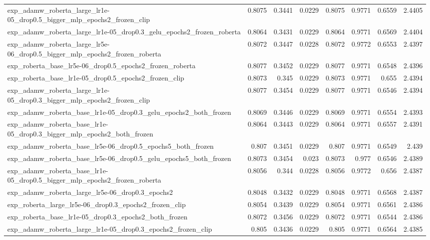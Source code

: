 \documentclass[a4paper,oneside,bibliography=totoc]{scrbook}
\begin{document}
\begin{landscape}
\begin{center}
\begin{longtable}{p{4cm} *{7}{r}}
        exp\_adamw\_roberta\_large\_lr1e-05\_drop0.5\_bigger\_mlp\_epochs2\_frozen\_clip & 0.8075 & 0.3441 & 0.0229 & 0.8075 & 0.9771 & 0.6559 & 2.4405 \\ 
        exp\_adamw\_roberta\_large\_lr1e-05\_drop0.3\_gelu\_epochs2\_frozen\_roberta & 0.8064 & 0.3431 & 0.0229 & 0.8064 & 0.9771 & 0.6569 & 2.4404 \\ 
        exp\_adamw\_roberta\_large\_lr5e-06\_drop0.5\_bigger\_mlp\_epochs2\_frozen\_roberta & 0.8072 & 0.3447 & 0.0228 & 0.8072 & 0.9772 & 0.6553 & 2.4397 \\ 
        exp\_roberta\_base\_lr5e-06\_drop0.5\_epochs2\_frozen\_roberta & 0.8077 & 0.3452 & 0.0229 & 0.8077 & 0.9771 & 0.6548 & 2.4396 \\ 
        exp\_roberta\_base\_lr1e-05\_drop0.5\_epochs2\_frozen\_clip & 0.8073 & 0.345 & 0.0229 & 0.8073 & 0.9771 & 0.655 & 2.4394 \\ 
        exp\_adamw\_roberta\_large\_lr1e-05\_drop0.3\_bigger\_mlp\_epochs2\_frozen\_clip & 0.8077 & 0.3454 & 0.0229 & 0.8077 & 0.9771 & 0.6546 & 2.4394 \\ 
        exp\_adamw\_roberta\_base\_lr1e-05\_drop0.3\_gelu\_epochs2\_both\_frozen & 0.8069 & 0.3446 & 0.0229 & 0.8069 & 0.9771 & 0.6554 & 2.4393 \\ 
        exp\_adamw\_roberta\_base\_lr1e-05\_drop0.3\_bigger\_mlp\_epochs2\_both\_frozen & 0.8064 & 0.3443 & 0.0229 & 0.8064 & 0.9771 & 0.6557 & 2.4391 \\ 
        exp\_adamw\_roberta\_base\_lr5e-06\_drop0.5\_epochs5\_both\_frozen & 0.807 & 0.3451 & 0.0229 & 0.807 & 0.9771 & 0.6549 & 2.439 \\ 
        exp\_adamw\_roberta\_base\_lr5e-06\_drop0.5\_gelu\_epochs5\_both\_frozen & 0.8073 & 0.3454 & 0.023 & 0.8073 & 0.977 & 0.6546 & 2.4389 \\ 
        exp\_adamw\_roberta\_base\_lr1e-05\_drop0.5\_bigger\_mlp\_epochs2\_frozen\_roberta & 0.8056 & 0.344 & 0.0228 & 0.8056 & 0.9772 & 0.656 & 2.4387 \\ 
        exp\_adamw\_roberta\_large\_lr5e-06\_drop0.3\_epochs2 & 0.8048 & 0.3432 & 0.0229 & 0.8048 & 0.9771 & 0.6568 & 2.4387 \\ 
        exp\_roberta\_large\_lr5e-06\_drop0.3\_epochs2\_frozen\_clip & 0.8054 & 0.3439 & 0.0229 & 0.8054 & 0.9771 & 0.6561 & 2.4386 \\ 
        exp\_roberta\_base\_lr1e-05\_drop0.3\_epochs2\_both\_frozen & 0.8072 & 0.3456 & 0.0229 & 0.8072 & 0.9771 & 0.6544 & 2.4386 \\ 
        exp\_adamw\_roberta\_large\_lr1e-05\_drop0.3\_epochs2\_frozen\_clip & 0.805 & 0.3436 & 0.0229 & 0.805 & 0.9771 & 0.6564 & 2.4385 \\ 

\end{longtable}
\end{center}
\end{landscape}
\end{document}
